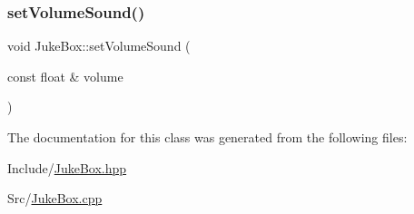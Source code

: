 \mbox{\label{class_juke_box_a7bf0efbd2d9e35361a345ebeafcfcb08}} 
\subsubsection{\texorpdfstring{setVolumeSound()}{setVolumeSound()}}
{\footnotesize\ttfamily void Juke\+Box\+::set\+Volume\+Sound (\begin{DoxyParamCaption}\item[{const float \&}]{volume }\end{DoxyParamCaption})}



The documentation for this class was generated from the following files\+:\begin{DoxyCompactItemize}
\item 
Include/\mbox{\hyperlink{_juke_box_8hpp}{Juke\+Box.\+hpp}}\item 
Src/\mbox{\hyperlink{_juke_box_8cpp}{Juke\+Box.\+cpp}}\end{DoxyCompactItemize}
